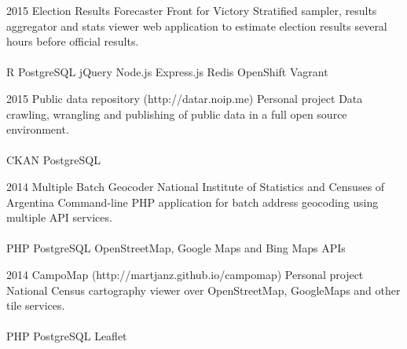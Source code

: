 \documentclass[]{cv-style}          %
\begin{document}
\begin{entrylist}
\entry
{2015}
{Election Results Forecaster}
{Front for Victory}
{Stratified sampler, results aggregator and stats viewer web application to estimate election results several hours before official results.\\
\\
  R \textbullet{} PostgreSQL \textbullet{} jQuery \textbullet{} Node.js \textbullet{} Express.js \textbullet{} Redis \textbullet{} OpenShift \textbullet{} Vagrant
}
{\vspace{-0.3cm}}
\end{entrylist}

\begin{entrylist}
\entry
{2015}
{Public data repository (http://datar.noip.me)}
{Personal project}
{Data crawling, wrangling and publishing of public data in a full open source environment.\\
\\
  CKAN \textbullet{} PostgreSQL
}
{\vspace{-0.3cm}}
\end{entrylist}

\begin{entrylist}
\entry
{2014}
{Multiple Batch Geocoder}
{National Institute of Statistics and Censuses of Argentina}
{Command-line PHP application for batch address geocoding using multiple API services.\\
\\
PHP \textbullet{} PostgreSQL \textbullet{} OpenStreetMap, Google Maps and Bing Maps APIs
}
{\vspace{-0.3cm}}
\end{entrylist}

\begin{entrylist}
\entry
{2014}
{CampoMap (http://martjanz.github.io/campomap)}
{Personal project}
{National Census cartography viewer over OpenStreetMap, GoogleMaps and other tile services.\\
\\ PHP \textbullet{} PostgreSQL \textbullet{} Leaflet
}
{\vspace{-0.3cm}}
\end{entrylist}
\\

\end{document}

